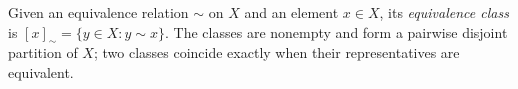 
Given an equivalence relation $\sim$ on $X$ and an element $x\in X$, its \emph{equivalence class} is $[x]_\sim=\{y\in X:y\sim x\}$. The classes are nonempty and form a pairwise disjoint partition of $X$; two classes coincide exactly when their representatives are equivalent.
